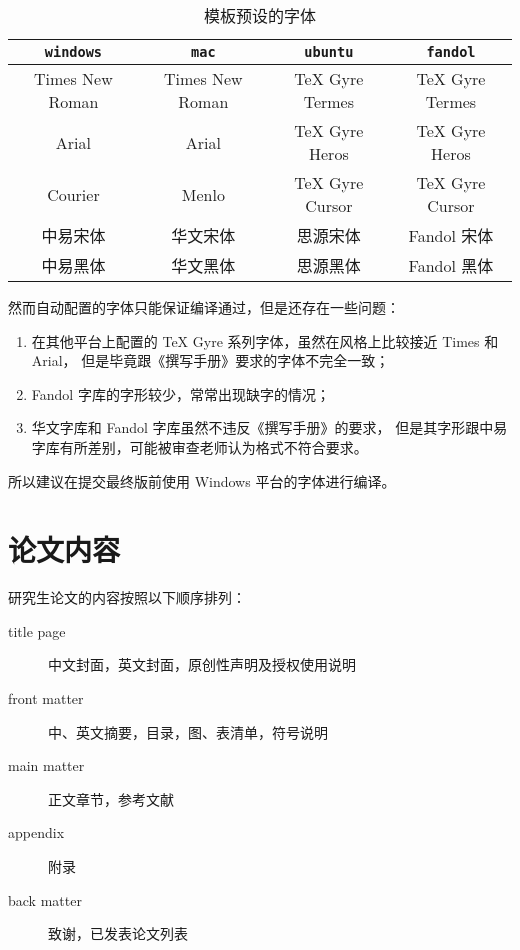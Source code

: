 \documentclass[a4paper]{ltxdoc}
\DeclareRobustCommand\opt{\texttt}
\begin{document}
\begin{table}[htb]
  \centering
  \caption{模板预设的字体}
  \label{tab:fontset}
  \begin{tabular}{cccc}
    \toprule
    \opt{windows} & \opt{mac}    & \opt{ubuntu} & \opt{fandol} \\
    \midrule
    Times New Roman  & Times New Roman & TeX Gyre Termes & TeX Gyre Termes \\
    Arial            & Arial           & TeX Gyre Heros  & TeX Gyre Heros  \\
    Courier          & Menlo           & TeX Gyre Cursor & TeX Gyre Cursor \\
    中易宋体         & 华文宋体        & 思源宋体        & Fandol 宋体     \\
    中易黑体         & 华文黑体        & 思源黑体        & Fandol 黑体     \\
    \bottomrule
  \end{tabular}
\end{table}

然而自动配置的字体只能保证编译通过，但是还存在一些问题：
\begin{enumerate}
  \item 在其他平台上配置的 TeX Gyre 系列字体，虽然在风格上比较接近 Times 和 Arial，
    但是毕竟跟《撰写手册》要求的字体不完全一致；
  \item Fandol 字库的字形较少，常常出现缺字的情况；
  \item 华文字库和 Fandol 字库虽然不违反《撰写手册》的要求，
    但是其字形跟中易字库有所差别，可能被审查老师认为格式不符合要求。
\end{enumerate}

所以建议在提交最终版前使用 Windows 平台的字体进行编译。



\section{论文内容}

研究生论文的内容按照以下顺序排列：
\begin{description}
  \item[title page] 中文封面，英文封面，原创性声明及授权使用说明
  \item[front matter] 中、英文摘要，目录，图、表清单，符号说明
  \item[main matter] 正文章节，参考文献
  \item[appendix] 附录
  \item[back matter] 致谢，已发表论文列表
\end{description}
\end{document}
